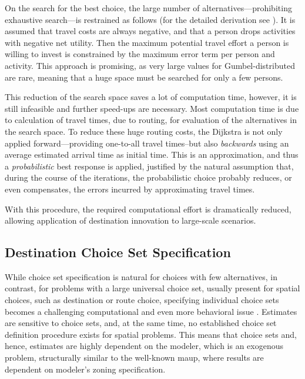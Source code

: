 On the search for the best choice, the large number of alternatives---prohibiting exhaustive search---is restrained as follows (for the detailed derivation see \citet[][p.51 ff.]{Horni_PhDThesis_2013}). It is assumed that travel costs are always negative, and that a person drops activities with negative net utility. Then the maximum potential travel effort a person is willing to invest is constrained by the maximum error term per person and activity. This approach is promising, as very large values for Gumbel-distributed are rare, meaning that a huge space must be searched for only a few persons. 

This reduction of the search space saves a lot of computation time, however, it is still infeasible and further speed-ups are necessary. Most computation time is due to calculation of travel times, \ie due to routing, for evaluation of the alternatives in the search space. To reduce these huge routing costs, the Dijkstra is not only applied forward---providing one-to-all travel times--but also \emph{backwards} using an average estimated arrival time as initial time. This is an approximation, and thus a \emph{probabilistic} best response is applied, justified by the natural assumption that, during the course of the iterations, the probabilistic choice probably reduces, or even compensates, the errors incurred by approximating travel times. 

With this procedure, the required computational effort is dramatically reduced, allowing application of destination innovation to large-scale scenarios.

\subsection{Destination Choice Set Specification}
While choice set specification is natural for choices with few alternatives, in contrast, for problems with a large universal choice set, usually present for spatial choices, such as destination or route choice, specifying individual choice sets becomes a challenging computational and even more behavioral issue \citep[e.g.,][]{PagliaraTimmermans_TransLett_2009, Thill_PHG_1992, Schuessler_PhDThesis_2010, FrejingerEtAl_TransResB_2009}. 
Estimates are sensitive to choice sets, and, at the same time, no established choice set definition procedure exists for spatial problems. 
This means that choice sets and, hence, estimates are highly dependent on the modeler, which is an exogenous problem, structurally similar to the well-known \gls{maup}, where results are dependent on modeler's zoning specification.

